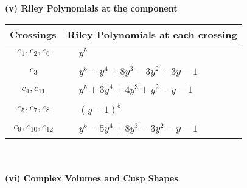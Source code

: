 \documentclass[1p]{elsarticle_modified}
\theoremstyle{definition}
\begin{document}
\newpage\renewcommand{\arraystretch}{1}
\flushleft \textbf{(v) Riley Polynomials at the component}\newline \\
\begin{tabular}{m{50pt}|m{274pt}}
Crossings & \hspace{64pt}Riley Polynomials at each crossing \\
\hline $$\begin{aligned}c_{1},c_{2},c_{6}\end{aligned}$$&$\begin{aligned}
&y^5
\end{aligned}$\\
\hline $$\begin{aligned}c_{3}\end{aligned}$$&$\begin{aligned}
&y^5- y^4+8 y^3-3 y^2+3 y-1
\end{aligned}$\\
\hline $$\begin{aligned}c_{4},c_{11}\end{aligned}$$&$\begin{aligned}
&y^5+3 y^4+4 y^3+y^2- y-1
\end{aligned}$\\
\hline $$\begin{aligned}c_{5},c_{7},c_{8}\end{aligned}$$&$\begin{aligned}
&(y-1)^5
\end{aligned}$\\
\hline $$\begin{aligned}c_{9},c_{10},c_{12}\end{aligned}$$&$\begin{aligned}
&y^5-5 y^4+8 y^3-3 y^2- y-1
\end{aligned}$\\
\hline
\end{tabular}\\~\\
\newpage\flushleft \textbf{(vi) Complex Volumes and Cusp Shapes}
\end{document}
